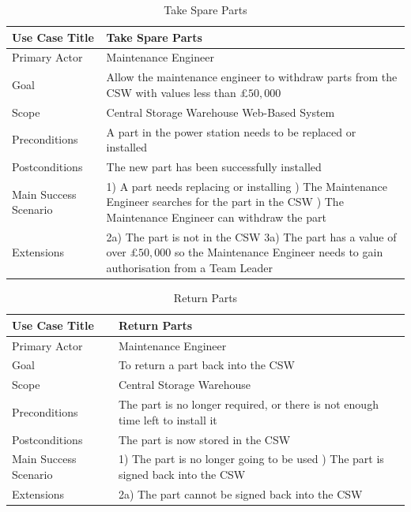 \begin{table}[]
	\centering
	\caption{Take Spare Parts}
	\label{Take-Spare-Parts}
	\begin{tabularx}{\textwidth}{| l | X |}
		\hline
		Use Case Title	&  Take Spare Parts\\ \hline \hline
		Primary Actor	&  Maintenance Engineer\\ \hline
		Goal	&  Allow the maintenance engineer to withdraw parts from the CSW with values less than \pounds$50,000$\\ \hline
		Scope	&  Central Storage Warehouse Web-Based System\\ \hline
		Preconditions	&  A part in the power station needs to be replaced or installed\\ \hline
		Postconditions	&  The new part has been successfully installed \\ \hline
		Main Success Scenario	&  
		1) A part needs replacing or installing \newline
		2) The Maintenance Engineer searches for the part in the CSW \newline
		3) The Maintenance Engineer can withdraw the part
		\\ \hline
		Extensions	&  2a) The part is not in the CSW \newline 3a) The part has a value of over \pounds$50,000$ so the Maintenance Engineer needs to gain authorisation from a Team Leader \\ \hline
	\end{tabularx}
\end{table}

\begin{table}[]
	\centering
	\caption{Return Parts}
	\label{Return-Parts}
	\begin{tabularx}{\textwidth}{| l | X |}
		\hline
		Use Case Title	&  Return Parts\\ \hline \hline
		Primary Actor	&  Maintenance Engineer\\ \hline
		Goal	&  To return a part back into the CSW\\ \hline
		Scope	&  Central Storage Warehouse\\ \hline
		Preconditions	&  The part is no longer required, or there is not enough time left to install it\\ \hline
		Postconditions	&  The part is now stored in the CSW\\ \hline
		Main Success Scenario	& 
		1) The part is no longer going to be used \newline
		2) The part is signed back into the CSW
		\\ \hline
		Extensions	&  2a) The part cannot be signed back into the CSW \\ \hline
	\end{tabularx}
\end{table}

